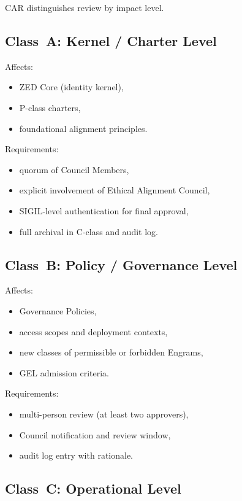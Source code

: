 CAR distinguishes review by impact level.

\subsection{Class~A: Kernel / Charter Level}

Affects:
\begin{itemize}
    \item ZED Core (identity kernel),
    \item P-class charters,
    \item foundational alignment principles.
\end{itemize}

Requirements:
\begin{itemize}
    \item quorum of Council Members,
    \item explicit involvement of Ethical Alignment Council,
    \item SIGIL-level authentication for final approval,
    \item full archival in C-class and audit log.
\end{itemize}

\subsection{Class~B: Policy / Governance Level}

Affects:
\begin{itemize}
    \item Governance Policies,
    \item access scopes and deployment contexts,
    \item new classes of permissible or forbidden Engrams,
    \item GEL admission criteria.
\end{itemize}

Requirements:
\begin{itemize}
    \item multi-person review (at least two approvers),
    \item Council notification and review window,
    \item audit log entry with rationale.
\end{itemize}

\subsection{Class~C: Operational Level}

